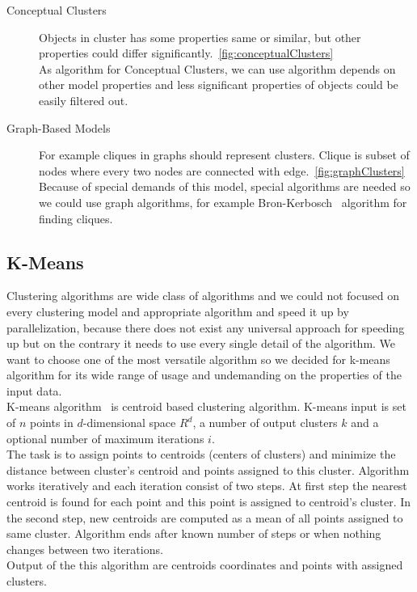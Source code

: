 \begin{description}
\item[Conceptual Clusters] Objects in cluster has some properties same or similar, but other properties could differ significantly.~\autoref{fig:conceptualClusters}\\
As algorithm for Conceptual Clusters, we can use algorithm depends on other model properties and less significant properties of objects could be easily filtered out.

\item[Graph-Based Models] For example cliques in graphs should represent clusters. Clique is subset of nodes where every two nodes are connected with edge.~\autoref{fig:graphClusters}\\
Because of special demands of this model, special algorithms are needed so we could use graph algorithms, for example Bron-Kerbosch~\cite{Sun15} algorithm for finding cliques.
\end{description}

\subsection{K-Means} 
Clustering algorithms are wide class of algorithms and we could not focused on every clustering model and appropriate algorithm and speed it up by parallelization, because there does not exist any universal approach for speeding up but on the contrary it needs to use every single detail of the algorithm. We want to choose one of the most versatile algorithm so we decided for k-means algorithm for its wide range of usage and undemanding on the properties of the input data.\\
K-means algorithm~\cite{Aggarwal13,Tan05} is centroid based clustering algorithm. K-means input is set of $n$ points in $d$-dimensional space $R^d$, a number of output clusters $k$ and a optional number of maximum iterations $i$. \\
The task is to assign points to centroids (centers of clusters) and minimize the distance between cluster's centroid and points assigned to this cluster. Algorithm works iteratively and each iteration consist of two steps. At first step the nearest centroid is found for each point and this point is assigned to centroid's cluster. In the second step, new centroids are computed as a mean of all points assigned to same cluster. Algorithm ends after known number of steps or when nothing changes between two iterations.\\
Output of the this algorithm are centroids coordinates and points with assigned clusters.


